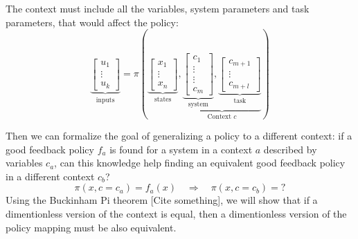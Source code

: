 The context must include all the variables, system parameters and task parameters, that would affect the  policy:
\begin{equation}
\underbrace{\begin{bmatrix}
u_1 \\
\vdots \\
u_k
\end{bmatrix}}_{\text{inputs}}
=
\pi \left(
\underbrace{\begin{bmatrix}
x_1 \\
\vdots \\
x_n
\end{bmatrix}}_{\text{states}}
,
\underbrace{
\underbrace{\begin{bmatrix}
c_1 \\
\vdots \\
\vdots \\
c_m
\end{bmatrix}}_{\text{system}}
,
\underbrace{\begin{bmatrix}
c_{m+1} \\
\vdots \\
c_{m+l}
\end{bmatrix}}_{\text{task}}
}_{\text{Context $c$}}
\right) 
\label{eq:vectorpolicy}
\end{equation}

Then we can formalize the goal of generalizing a policy to a different context: if a good feedback policy $f_a$ is found for a system in a context $a$ described by variables $c_a$, can this knowledge help finding an equivalent good feedback policy in a different context $c_b$?
\begin{equation}
\pi \left(
x,
c = c_a
\right) = 
f_a \left(
x 
\right) 
\quad \Rightarrow \quad
\pi \left(
x,
c = c_b
\right) = ?
\end{equation}
Using the Buckinham Pi theorem [Cite something], we will show that if a dimentionless version of the context is equal, then a dimentionless version of the policy mapping must be also equivalent.



